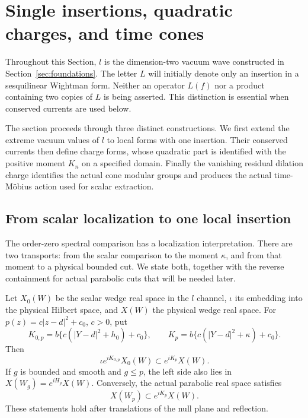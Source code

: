 \section{Single insertions, quadratic charges, and time cones}
\label{sec:charges-cones}

Throughout this Section, $l$ is the dimension-two vacuum wave constructed in
Section~\ref{sec:foundations}. The letter $L$ will initially denote only an
insertion in a sesquilinear Wightman form. Neither an operator $L(f)$ nor a
product containing two copies of $L$ is being asserted. This distinction is
essential when conserved currents are used below.

The section proceeds through three distinct constructions.  We first
extend the extreme vacuum values of $l$ to local forms with one
insertion.  Their conserved currents then define charge forms, whose
quadratic part is identified with the positive moment $K_n$ on a
specified domain.  Finally the vanishing residual dilation charge
identifies the actual cone modular groups and produces the actual
time-M\"obius action used for scalar extraction.

\subsection{From scalar localization to one local insertion}

The order-zero spectral comparison has a localization interpretation.
There are two transports: from the scalar comparison to the moment
$\kappa$, and from that moment to a physical bounded cut. We state both,
together with the reverse containment for actual parabolic cuts that
will be needed later.

\begin{lemma}\label{C:localization-transport}
Let $X_0(W)$ be the scalar wedge real space in the $l$ channel,
$\iota$ its embedding into the physical Hilbert space, and $X(W)$ the
physical wedge real space. For $p(z)=c|z-d|^2+c_0$, $c>0$, put
\[
 K_{0,p}=b\{c(|Y-d|^2+h_0)+c_0\},\qquad
 K_p=b\{c(|Y-d|^2+\kappa)+c_0\}.
\]
Then
\begin{equation}\label{C:moment-localization}
 \iota e^{iK_{0,p}}X_0(W)\subset e^{iK_p}X(W).
\end{equation}
If $g$ is bounded and smooth and $g\le p$, the left side also lies in
$X(W_g)=e^{iH_g}X(W)$. Conversely, the actual parabolic real space
satisfies
\begin{equation}\label{C:actual-parabolic-localization}
 X(W_p)\subset e^{iK_p}X(W).
\end{equation}
These statements hold after translations of the null plane and reflection.
\end{lemma}

